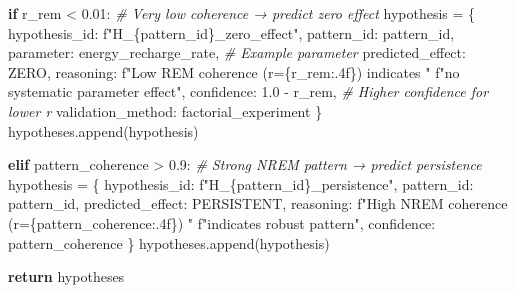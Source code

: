 \documentclass[
]{article}
\newenvironment{Shaded}{}{}
\newcommand{\CommentTok}[1]{\textcolor[rgb]{0.38,0.63,0.69}{\textit{#1}}}
\newcommand{\ControlFlowTok}[1]{\textcolor[rgb]{0.00,0.44,0.13}{\textbf{#1}}}
\newcommand{\FloatTok}[1]{\textcolor[rgb]{0.25,0.63,0.44}{#1}}
\newcommand{\NormalTok}[1]{#1}
\newcommand{\OperatorTok}[1]{\textcolor[rgb]{0.40,0.40,0.40}{#1}}
\newcommand{\SpecialCharTok}[1]{\textcolor[rgb]{0.25,0.44,0.63}{#1}}
\newcommand{\SpecialStringTok}[1]{\textcolor[rgb]{0.73,0.40,0.53}{#1}}
\newcommand{\StringTok}[1]{\textcolor[rgb]{0.25,0.44,0.63}{#1}}
\begin{document}
\begin{Shaded}
\begin{Highlighting}[]
        \ControlFlowTok{if}\NormalTok{ r\_rem }\OperatorTok{\textless{}} \FloatTok{0.01}\NormalTok{:  }\CommentTok{\# Very low coherence → predict zero effect}
\NormalTok{            hypothesis }\OperatorTok{=}\NormalTok{ \{}
                \StringTok{\textquotesingle{}hypothesis\_id\textquotesingle{}}\NormalTok{: }\SpecialStringTok{f"H\_}\SpecialCharTok{\{}\NormalTok{pattern\_id}\SpecialCharTok{\}}\SpecialStringTok{\_zero\_effect"}\NormalTok{,}
                \StringTok{\textquotesingle{}pattern\_id\textquotesingle{}}\NormalTok{: pattern\_id,}
                \StringTok{\textquotesingle{}parameter\textquotesingle{}}\NormalTok{: }\StringTok{\textquotesingle{}energy\_recharge\_rate\textquotesingle{}}\NormalTok{,  }\CommentTok{\# Example parameter}
                \StringTok{\textquotesingle{}predicted\_effect\textquotesingle{}}\NormalTok{: }\StringTok{\textquotesingle{}ZERO\textquotesingle{}}\NormalTok{,}
                \StringTok{\textquotesingle{}reasoning\textquotesingle{}}\NormalTok{: }\SpecialStringTok{f"Low REM coherence (r=}\SpecialCharTok{\{}\NormalTok{r\_rem}\SpecialCharTok{:.4f\}}\SpecialStringTok{) indicates "}
                            \SpecialStringTok{f"no systematic parameter effect"}\NormalTok{,}
                \StringTok{\textquotesingle{}confidence\textquotesingle{}}\NormalTok{: }\FloatTok{1.0} \OperatorTok{{-}}\NormalTok{ r\_rem,  }\CommentTok{\# Higher confidence for lower r}
                \StringTok{\textquotesingle{}validation\_method\textquotesingle{}}\NormalTok{: }\StringTok{\textquotesingle{}factorial\_experiment\textquotesingle{}}
\NormalTok{            \}}
\NormalTok{            hypotheses.append(hypothesis)}

        \ControlFlowTok{elif}\NormalTok{ pattern\_coherence }\OperatorTok{\textgreater{}} \FloatTok{0.9}\NormalTok{:  }\CommentTok{\# Strong NREM pattern → predict persistence}
\NormalTok{            hypothesis }\OperatorTok{=}\NormalTok{ \{}
                \StringTok{\textquotesingle{}hypothesis\_id\textquotesingle{}}\NormalTok{: }\SpecialStringTok{f"H\_}\SpecialCharTok{\{}\NormalTok{pattern\_id}\SpecialCharTok{\}}\SpecialStringTok{\_persistence"}\NormalTok{,}
                \StringTok{\textquotesingle{}pattern\_id\textquotesingle{}}\NormalTok{: pattern\_id,}
                \StringTok{\textquotesingle{}predicted\_effect\textquotesingle{}}\NormalTok{: }\StringTok{\textquotesingle{}PERSISTENT\textquotesingle{}}\NormalTok{,}
                \StringTok{\textquotesingle{}reasoning\textquotesingle{}}\NormalTok{: }\SpecialStringTok{f"High NREM coherence (r=}\SpecialCharTok{\{}\NormalTok{pattern\_coherence}\SpecialCharTok{:.4f\}}\SpecialStringTok{) "}
                            \SpecialStringTok{f"indicates robust pattern"}\NormalTok{,}
                \StringTok{\textquotesingle{}confidence\textquotesingle{}}\NormalTok{: pattern\_coherence}
\NormalTok{            \}}
\NormalTok{            hypotheses.append(hypothesis)}

    \ControlFlowTok{return}\NormalTok{ hypotheses}
\end{Highlighting}
\end{Shaded}
\end{document}
